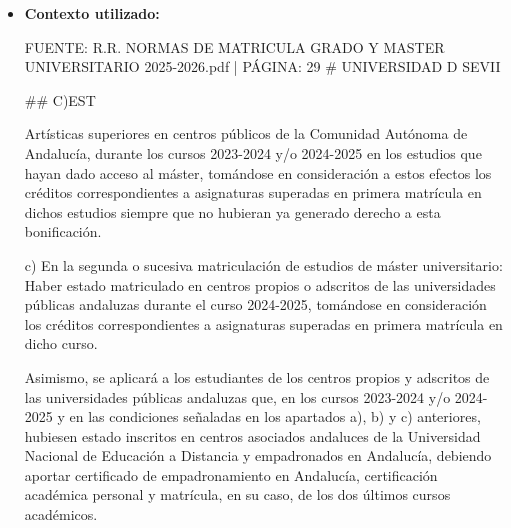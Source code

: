 \documentclass{article}
\begin{document}
\begin{itemize}
\begin{itemize}
                Es importante destacar que, según la normativa, la bonificación se aplicará solo a los créditos que sean necesarios para la obtención del título conforme al plan de estudios y, en su caso, las especialidades y menciones vinculadas al título donde proceda la bonificación.

                Además, se establece que la bonificación no se aplicará en los supuestos de reconocimiento de créditos, salvo en el caso de estudios realizados en Programas de Movilidad Estudiantil, ya sea en el marco de la Unión Europea, ya sea realizados mediante convenios específicos entre universidades y conforme al correspondiente acuerdo académico de movilidad firmado por los estudiantes.

                En resumen, según la Normativa de Matrícula y Precios de la Universidad de Sevilla, los estudiantes que superen créditos en primera matrícula durante el curso anterior tienen derecho a una bonificación de matrícula, siempre y cuando cumplan con los requisitos establecidos en la normativa.
          \item \textbf{Contexto utilizado:}
                \begin{scriptsize}
                  FUENTE: R.R. NORMAS DE MATRICULA GRADO Y MASTER UNIVERSITARIO 2025-2026.pdf | PÁGINA: 29
                  \# UNIVERSIDAD D SEVII

                  \#\# C)EST

                  Artísticas superiores en centros públicos de la Comunidad Autónoma de Andalucía, durante los cursos 2023-2024 y/o 2024-2025 en los estudios que hayan dado acceso al máster, tomándose en consideración a estos efectos los créditos correspondientes a asignaturas superadas en primera matrícula en dichos estudios siempre que no hubieran ya generado derecho a esta bonificación.

                  c) En la segunda o sucesiva matriculación de estudios de máster universitario: Haber estado matriculado en centros propios o adscritos de las universidades públicas andaluzas durante el curso 2024-2025, tomándose en consideración los créditos correspondientes a asignaturas superadas en primera matrícula en dicho curso.

                  Asimismo, se aplicará a los estudiantes de los centros propios y adscritos de las universidades públicas andaluzas que, en los cursos 2023-2024 y/o 2024-2025 y en las condiciones señaladas en los apartados a), b) y c) anteriores, hubiesen estado inscritos en centros asociados andaluces de la Universidad Nacional de Educación a Distancia y empadronados en Andalucía, debiendo aportar certificado de empadronamiento en Andalucía, certificación académica personal y matrícula, en su caso, de los dos últimos cursos académicos.


\end{scriptsize}
\end{itemize}
\end{itemize}
\end{document}
